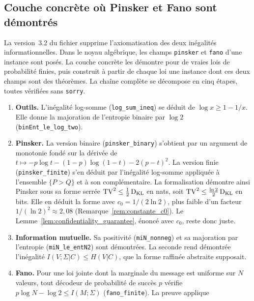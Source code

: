 \subsection{Couche concr\`ete o\`u Pinsker et Fano sont d\'emontr\'es}
\label{subsec:lean4_concret}
\begin{sloppypar}
La version~3.2 du fichier supprime l'axiomatisation des deux in\'egalit\'es
informationnelles. Dans le noyau alg\'ebrique, les champs \texttt{pinsker} et
\texttt{fano} d'une instance sont pos\'es. La couche concr\`ete les d\'emontre pour
de vraies lois de probabilit\'e finies, puis construit \`a partir de chaque loi une
instance dont ces deux champs sont des th\'eor\`emes. La cha\^ine compl\`ete se
d\'ecompose en cinq \'etapes, toutes v\'erifi\'ees sans \texttt{sorry}.
\begin{enumerate}
\item \textbf{Outils.} L'in\'egalit\'e log-somme (\texttt{log\_sum\_ineq}) se d\'eduit de
      $\log x \geq 1 - 1/x$. Elle donne la majoration de l'entropie binaire par
      $\log 2$ (\texttt{binEnt\_le\_log\_two}).
\item \textbf{Pinsker.} La version binaire (\texttt{pinsker\_binary}) s'obtient par
      un argument de monotonie fond\'e sur la d\'eriv\'ee de
      $t \mapsto -p\log t - (1-p)\log(1-t) - 2(p-t)^2$. La version finie
      (\texttt{pinsker\_finite}) s'en d\'eduit par l'in\'egalit\'e log-somme appliqu\'ee \`a
      l'ensemble $\{P > Q\}$ et \`a son compl\'ementaire. La formalisation d\'emontre
      ainsi Pinsker sous sa forme serr\'ee $\operatorname{TV}^2 \leq \tfrac12 \operatorname{D_{\text{KL}}}$ en nats, soit
      $\operatorname{TV}^2 \leq \tfrac{\ln 2}{2}\operatorname{D_{\text{KL}}}$ en bits. Elle en d\'eduit la forme avec
      $c_0 = 1/(2\ln 2)$, plus faible d'un facteur $1/(\ln 2)^2 \approx 2{,}08$
      (Remarque~\ref{rem:constante_c0}). Le Lemme~\ref{lem:confidentiality_guarantee},
      \'enonc\'e avec $c_0$, reste donc juste.
\item \textbf{Information mutuelle.} Sa positivit\'e (\texttt{miN\_nonneg}) et sa
      majoration par l'entropie (\texttt{miN\_le\_entN2}) sont d\'emontr\'ees. La
      seconde rend d\'emontr\'ee l'in\'egalit\'e $I(V;\Sigma|C) \leq H(V|C)$, que la forme
      raffin\'ee abstraite supposait.
\item \textbf{Fano.} Pour une loi jointe dont la marginale du message est uniforme
      sur $N$ valeurs, tout d\'ecodeur de probabilit\'e de succ\`es $p$ v\'erifie
      $p\log N - \log 2 \leq I(M;\Sigma)$ (\texttt{fano\_finite}). La preuve applique

\end{enumerate}
\end{sloppypar}
